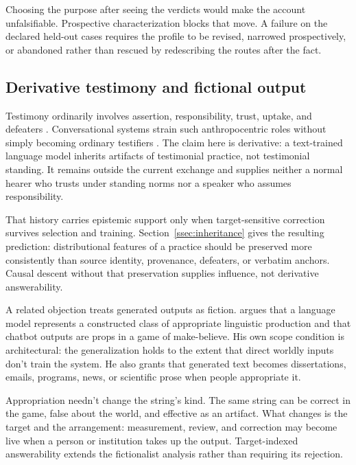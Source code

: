 \documentclass[12pt]{article}
\begin{document}
Choosing the purpose after seeing the verdicts would make the account unfalsifiable.
Prospective characterization blocks that move. A failure on the declared held-out cases
requires the profile to be revised, narrowed prospectively, or abandoned rather than
rescued by redescribing the routes after the fact.

\subsection{Derivative testimony and fictional output}

Testimony ordinarily involves assertion, responsibility, trust, uptake, and defeaters
\citep{coady_1992_testimony,lackey_2008_learning_from_words,goldberg_2010_relying_on_others}.
Conversational systems strain such anthropocentric roles without simply becoming ordinary
testifiers \citep{freiman_2024_ai_testimony}. The claim here is derivative: a
text-trained language model inherits artifacts of testimonial practice, not testimonial
standing. It remains outside the current exchange and supplies neither a normal hearer who
trusts under standing norms nor a speaker who assumes responsibility.

That history carries epistemic support only when target-sensitive correction survives
selection and training. Section~\ref{ssec:inheritance} gives the resulting prediction:
distributional features of a practice should be preserved more consistently than source
identity, provenance, defeaters, or verbatim anchors. Causal descent without that
preservation supplies influence, not derivative answerability.

A related objection treats generated outputs as fiction. \textcite{ruyant_2026_what_do_llms_represent}
argues that a language model represents a constructed class of appropriate linguistic
production and that chatbot outputs are props in a game of make-believe. His own scope
condition is architectural: the generalization holds to the extent that direct worldly
inputs don't train the system. He also grants that generated text becomes dissertations,
emails, programs, news, or scientific prose when people appropriate it.

Appropriation needn't change the string's kind. The same string can be correct in the game,
false about the world, and effective as an artifact. What changes is the target and the
arrangement: measurement, review, and correction may become live when a person or
institution takes up the output. Target-indexed answerability extends the fictionalist
analysis rather than requiring its rejection.
\end{document}
